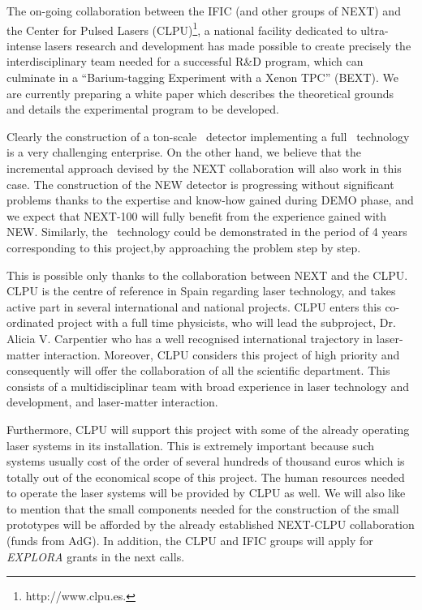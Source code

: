 \documentclass[a4paper,11pt,oneside]{article}
\begin{document}
The on-going collaboration between the IFIC (and other groups of NEXT) and the Center for Pulsed Lasers (CLPU)\footnote{http://www.clpu.es.}, a national facility dedicated to ultra-intense lasers research and development has made possible to create precisely the interdisciplinary team needed for a successful R\&D program, which can culminate in a ``Barium-tagging Experiment with a Xenon TPC'' (BEXT). We are currently preparing a white paper which describes the theoretical grounds and details the experimental program to be developed. 

Clearly the construction of a ton-scale \HPXE\ detector implementing a full \BATA\ technology is a very challenging enterprise. On the other hand, we believe that the incremental approach devised by the NEXT collaboration will also work in this case. The construction of the NEW detector is progressing without significant problems thanks to the expertise and know-how gained during DEMO phase, and we expect that NEXT-100 will fully benefit from the experience gained with NEW. Similarly, the \BATA\ technology could be demonstrated in the period of 4 years corresponding to this project,by approaching the problem step by step. 

This is possible only thanks to the collaboration between NEXT and the CLPU.
CLPU is the centre of reference in Spain regarding laser technology, and takes active part in several international and national projects. CLPU enters this co-ordinated project with a full time physicists, who will lead the subproject, Dr. Alicia V. Carpentier who has a well recognised international trajectory in laser-matter interaction. Moreover, CLPU considers this project of high priority and consequently will offer the collaboration of all the scientific department. This consists of a multidisciplinar team with broad experience in laser technology and development, and laser-matter interaction. 

Furthermore, CLPU will support this project with some of the already operating laser systems in its installation. This is extremely important because such systems usually cost of the order of several hundreds of thousand euros which is totally out of the economical scope of this project. The human resources needed to operate the laser systems will be provided by CLPU as well. We will  also like to mention that the small components needed for the construction of the small prototypes will be afforded by the already established NEXT-CLPU collaboration (funds from AdG). In addition, the CLPU and IFIC groups will apply for  \emph{EXPLORA} grants in the next calls.
\end{document}
